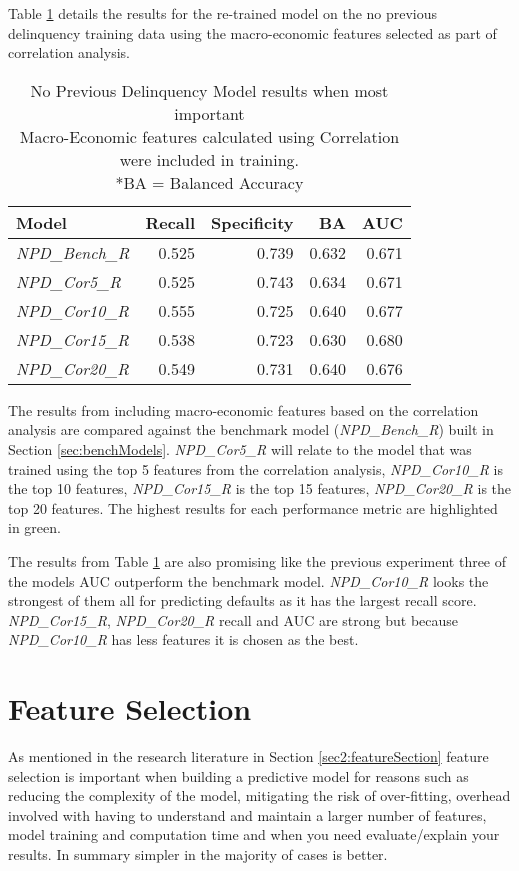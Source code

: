 Table \ref{table:NPDCorrModelResults} details the results for the
re-trained model on the no previous delinquency training data using the macro-economic features selected as part of correlation analysis.
\begin{table}[H]
	\centering
	\small
	\begin{tabular}{l r r r r}
		\hline
		\textbf{Model} & \textbf{Recall} & \textbf{Specificity} & \textbf{BA} & \textbf{AUC}  \\ \hline
		\textit{NPD\_Bench\_R} & 0.525 & 0.739 & 0.632 & 0.671   \\ \hline
		\textit{NPD\_Cor5\_R}  & 0.525 & \cellcolor{green!25}0.743 & 0.634 & 0.671   \\ 
		\textit{NPD\_Cor10\_R} & \cellcolor{green!25}0.555 & 0.725 & \cellcolor{green!25}0.640 & 0.677  \\ 
		\textit{NPD\_Cor15\_R} & 0.538 & 0.723 & 0.630 & \cellcolor{green!25}0.680  \\
		\textit{NPD\_Cor20\_R} & 0.549 & 0.731 & \cellcolor{green!25}0.640 & 0.676  \\\hline 
	\end{tabular}
	\caption{No Previous Delinquency Model results when most important \\Macro-Economic features calculated using Correlation were included in training.\\
		*BA = Balanced Accuracy}
	\label{table:NPDCorrModelResults}
\end{table}

The results from including macro-economic features based on the correlation analysis are compared against the benchmark model (\textit{NPD\_Bench\_R}) built in Section \ref{sec:benchModels}. \textit{NPD\_Cor5\_R} will relate to the model that was trained using the top 5 features from the correlation analysis, \textit{NPD\_Cor10\_R} is the top 10 features, \textit{NPD\_Cor15\_R} is the top 15 features, \textit{NPD\_Cor20\_R} is the top 20 features. The highest results for each performance metric are highlighted in green.

The results from Table \ref{table:NPDCorrModelResults} are also
promising like the previous experiment three of the models AUC outperform the benchmark model. \textit{NPD\_Cor10\_R} looks the strongest of them all for predicting defaults as it has the largest recall score.  \textit{NPD\_Cor15\_R},  \textit{NPD\_Cor20\_R} recall and AUC are strong but because  \textit{NPD\_Cor10\_R} has less features it is chosen as the best.

\section{Feature Selection}
As mentioned in the research literature in Section \ref{sec2:featureSection} feature selection is important when building a predictive model for reasons such as reducing the complexity of the model, mitigating the risk of over-fitting, overhead involved with having to understand and maintain a larger number of features, model training and computation time and when you need evaluate/explain your results. In summary simpler in the majority of cases is better.

